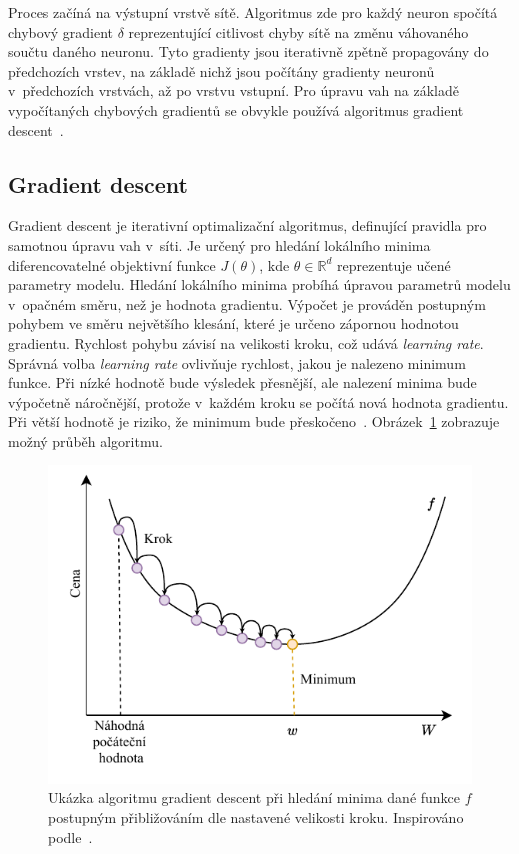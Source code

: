 Proces začíná na výstupní vrstvě sítě. Algoritmus zde pro každý neuron spočítá chybový gradient $\delta$ reprezentující citlivost chyby sítě na změnu váhovaného součtu daného neuronu. Tyto gradienty jsou iterativně zpětně propagovány do předchozích vrstev, na základě nichž jsou počítány gradienty neuronů v~předchozích vrstvách, až po vrstvu vstupní. Pro úpravu vah na základě vypočítaných chybových gradientů se obvykle používá algoritmus gradient descent~\cite{mitdeeplearning_small}.




\subsection*{Gradient descent}
Gradient descent je iterativní optimalizační algoritmus, definující pravidla pro samotnou úpravu vah v~síti. Je určený pro hledání lokálního minima diferencovatelné objektivní funkce $J(\theta)$, kde $\theta \in \mathbb{R}^d$ reprezentuje učené parametry modelu. Hledání lokálního minima probíhá úpravou parametrů modelu v~opačném směru, než je hodnota gradientu. Výpočet je prováděn postupným pohybem ve směru největšího klesání, které je určeno zápornou hodnotou gradientu. Rychlost pohybu závisí na velikosti kroku, což udává \textit{learning rate}. Správná volba \textit{learning rate} ovlivňuje rychlost, jakou je nalezeno minimum funkce. Při nízké hodnotě bude výsledek přesnější, ale nalezení minima bude výpočetně náročnější, protože v~každém kroku se počítá nová hodnota gradientu. Při větší hodnotě je riziko, že minimum bude přeskočeno~\cite{ruder2016overview}. Obrázek~\ref{fig:gradientdescent} zobrazuje možný průběh algoritmu.
\begin{figure}[H]
    \centering
    \includegraphics[scale=1.0]{obrazky-figures/gradientdescent.pdf}
    \caption{\label{fig:gradientdescent}Ukázka algoritmu gradient descent při hledání minima dané funkce $f$ postupným přibližováním dle nastavené velikosti kroku. Inspirováno podle~\cite{graddescent}.}
\end{figure}

